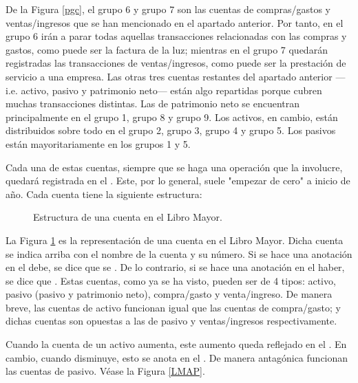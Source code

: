 De la Figura \ref{pgc}, el grupo 6 y grupo 7 son las cuentas de compras/gastos y ventas/ingresos que se han mencionado en el apartado anterior. Por tanto, en el grupo 6 irán a parar todas aquellas transacciones relacionadas con las compras y gastos, como puede ser la factura de la luz; mientras en el grupo 7 quedarán registradas las transacciones de ventas/ingresos, como  puede ser la prestación de servicio a una empresa. Las otras tres cuentas restantes del apartado anterior ---i.e. activo, pasivo y patrimonio neto--- están algo repartidas porque cubren muchas transacciones distintas. Las de patrimonio neto se encuentran principalmente en el grupo 1, grupo 8 y grupo 9. Los activos, en cambio, están distribuidos sobre todo en el grupo 2, grupo 3, grupo 4 y grupo 5. Los pasivos están mayoritariamente en los grupos 1 y 5.

Cada una de estas cuentas, siempre que se haga una operación que la involucre, quedará registrada en el . Este, por lo general, suele "empezar de cero" a inicio de año. Cada cuenta tiene la siguiente estructura:
\begin{figure}[H]
    \centering
    \caption{Estructura de una cuenta en el Libro Mayor.}
    \label{LM}
\end{figure}
La Figura \ref{LM} es la representación de una cuenta en el Libro Mayor. Dicha cuenta se indica arriba con el nombre de la cuenta y su número. Si se hace una anotación en el debe, se dice que se . De lo contrario, si se hace una anotación en el haber, se dice que . Estas cuentas, como ya se ha visto, pueden ser de 4 tipos: activo, pasivo (pasivo y patrimonio neto), compra/gasto y venta/ingreso. De manera breve, las cuentas de activo funcionan igual que las cuentas de compra/gasto; y dichas cuentas son opuestas a las de pasivo y ventas/ingresos respectivamente. 

\bigskip


Cuando la cuenta de un activo aumenta, este aumento queda reflejado en el . En cambio, cuando disminuye, esto se anota en el . De manera antagónica funcionan las cuentas de pasivo. Véase la Figura \ref{LMAP}.


